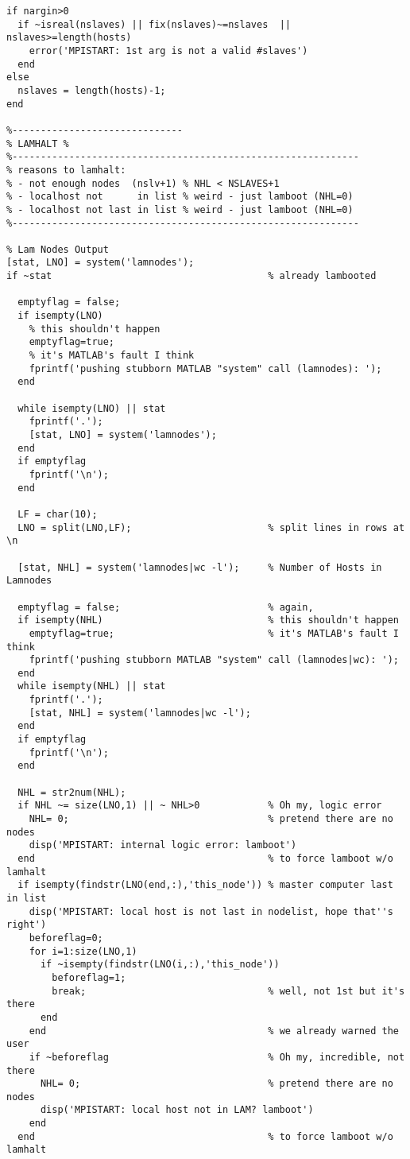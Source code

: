 \begin{lstlisting}[linerange={1-1,16-325}]
if nargin>0
  if ~isreal(nslaves) || fix(nslaves)~=nslaves  || nslaves>=length(hosts)
    error('MPISTART: 1st arg is not a valid #slaves')
  end
else
  nslaves = length(hosts)-1;
end

%------------------------------
% LAMHALT %
%-------------------------------------------------------------
% reasons to lamhalt:
% - not enough nodes  (nslv+1) % NHL < NSLAVES+1
% - localhost not      in list % weird - just lamboot (NHL=0)
% - localhost not last in list % weird - just lamboot (NHL=0)
%-------------------------------------------------------------

% Lam Nodes Output
[stat, LNO] = system('lamnodes');
if ~stat                                      % already lambooted
  
  emptyflag = false;
  if isempty(LNO)
    % this shouldn't happen
    emptyflag=true;
    % it's MATLAB's fault I think
    fprintf('pushing stubborn MATLAB "system" call (lamnodes): ');
  end
  
  while isempty(LNO) || stat
    fprintf('.');
    [stat, LNO] = system('lamnodes');
  end
  if emptyflag
    fprintf('\n'); 
  end 

  LF = char(10);
  LNO = split(LNO,LF);                        % split lines in rows at \n
  
  [stat, NHL] = system('lamnodes|wc -l');     % Number of Hosts in Lamnodes
        
  emptyflag = false;                          % again,
  if isempty(NHL)                             % this shouldn't happen
    emptyflag=true;                           % it's MATLAB's fault I think
    fprintf('pushing stubborn MATLAB "system" call (lamnodes|wc): ');
  end
  while isempty(NHL) || stat
    fprintf('.');
    [stat, NHL] = system('lamnodes|wc -l');
  end
  if emptyflag
    fprintf('\n'); 
  end
  
  NHL = str2num(NHL);
  if NHL ~= size(LNO,1) || ~ NHL>0            % Oh my, logic error
    NHL= 0;                                   % pretend there are no nodes
    disp('MPISTART: internal logic error: lamboot')
  end                                         % to force lamboot w/o lamhalt
  if isempty(findstr(LNO(end,:),'this_node')) % master computer last in list
    disp('MPISTART: local host is not last in nodelist, hope that''s right')
    beforeflag=0;
    for i=1:size(LNO,1)
      if ~isempty(findstr(LNO(i,:),'this_node'))
        beforeflag=1; 
        break;                                % well, not 1st but it's there
      end
    end                                       % we already warned the user
    if ~beforeflag                            % Oh my, incredible, not there
      NHL= 0;                                 % pretend there are no nodes
      disp('MPISTART: local host not in LAM? lamboot')
    end
  end                                         % to force lamboot w/o lamhalt


\end{lstlisting}
